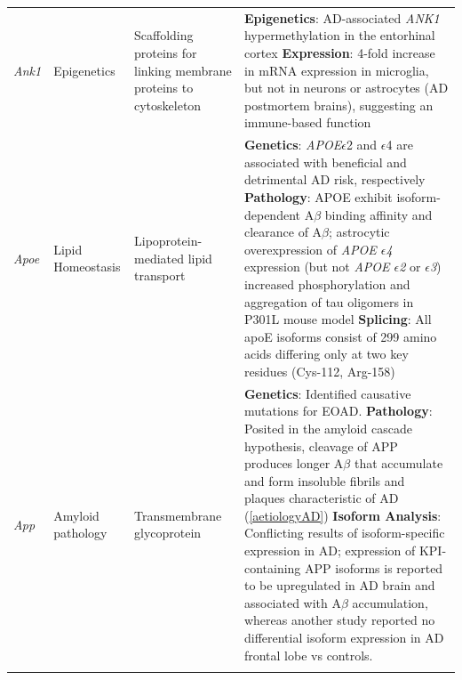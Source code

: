 \begin{changemargin}{1.5cm}
\begin{landscape}
\begin{longtable}[c]{p{1cm}p{2cm}p{4cm}p{19cm}}
			\centering \textit{Ank1} &
			\centering Epigenetics  &
			\centering Scaffolding proteins for linking membrane proteins to cytoskeleton &
			\tabitem \textbf{Epigenetics}: AD-associated \textit{ANK1} hypermethylation in the entorhinal cortex \cite{Smith2019, Lunnon2014} \newline 
			\tabitem \textbf{Expression}: 4-fold increase in mRNA expression in microglia, but not in neurons or astrocytes (AD postmortem brains), suggesting an immune-based function \cite{Mastroeni2017}  \\
			\hdashline[0.5pt/5pt]
			
			\centering \textit{Apoe} &
			\centering Lipid Homeostasis  &
			\centering Lipoprotein-mediated lipid transport  &
			\tabitem \textbf{Genetics}: \textit{APOE}$\epsilon$2 and $\epsilon$4 are associated with beneficial and detrimental AD risk, respectively \newline
			\tabitem \textbf{Pathology}: APOE exhibit isoform-dependent A$\beta$ binding affinity and clearance of A$\beta$; astrocytic overexpression of \textit{APOE $\epsilon$4} expression (but not \textit{APOE $\epsilon$2} or \textit{$\epsilon$3}) increased phosphorylation and aggregation of tau oligomers in P301L mouse model\cite{Jablonski2021} \newline
			\tabitem \textbf{Splicing}: All apoE isoforms consist of 299 amino acids differing only at two key residues (Cys-112, Arg-158) \\
			\hdashline[0.5pt/5pt]
			
			\centering \textit{App} &
			\centering Amyloid pathology  &
			\centering Transmembrane glycoprotein  &
			\tabitem \textbf{Genetics}: Identified causative mutations for EOAD. \newline
			\tabitem \textbf{Pathology}: Posited in the amyloid cascade hypothesis, cleavage of APP produces longer A$\beta$ that accumulate and form insoluble fibrils and plaques characteristic of AD (\cref{aetiologyAD})\newline
			\tabitem \textbf{Isoform Analysis}: Conflicting results of isoform-specific expression in AD; expression of KPI-containing APP isoforms is reported to be upregulated in AD brain and associated with A$\beta$ accumulation\cite{Zhang2011}, whereas another study reported no differential isoform expression in AD frontal lobe vs controls\cite{Panegyres2000}. \\
			\hdashline[0.5pt/5pt]
			

\end{longtable}
\end{landscape}
\end{changemargin}
